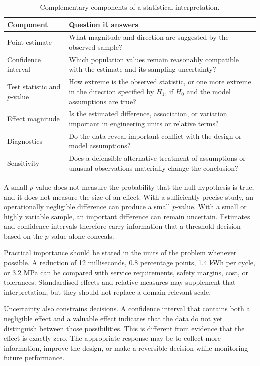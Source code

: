 \begin{table}[htbp]
\centering
\caption{Complementary components of a statistical interpretation.}
\label{tab:integrated-result-components}
\begin{tabularx}{\textwidth}{@{}l>{\raggedright\arraybackslash}X@{}}
\toprule
Component & Question it answers \\
\midrule
Point estimate & What magnitude and direction are suggested by the observed sample? \\
Confidence interval & Which population values remain reasonably compatible with the estimate and its sampling uncertainty? \\
Test statistic and $p$-value & How extreme is the observed statistic, or one more extreme in the direction specified by $H_1$, if $H_0$ and the model assumptions are true? \\
Effect magnitude & Is the estimated difference, association, or variation important in engineering units or relative terms? \\
Diagnostics & Do the data reveal important conflict with the design or model assumptions? \\
Sensitivity & Does a defensible alternative treatment of assumptions or unusual observations materially change the conclusion? \\
\bottomrule
\end{tabularx}
\end{table}

\FloatBarrier

A small $p$-value does not measure the probability that the null hypothesis is true, and it does not measure the size of an effect. With a sufficiently precise study, an operationally negligible difference can produce a small $p$-value. With a small or highly variable sample, an important difference can remain uncertain. Estimates and confidence intervals therefore carry information that a threshold decision based on the $p$-value alone conceals.

Practical importance should be stated in the units of the problem whenever possible. A reduction of 12 milliseconds, 0.8 percentage points, 1.4 kWh per cycle, or 3.2 MPa can be compared with service requirements, safety margins, cost, or tolerances. Standardised effects and relative measures may supplement that interpretation, but they should not replace a domain-relevant scale.

Uncertainty also constrains decisions. A confidence interval that contains both a negligible effect and a valuable effect indicates that the data do not yet distinguish between those possibilities. This is different from evidence that the effect is exactly zero. The appropriate response may be to collect more information, improve the design, or make a reversible decision while monitoring future performance.

